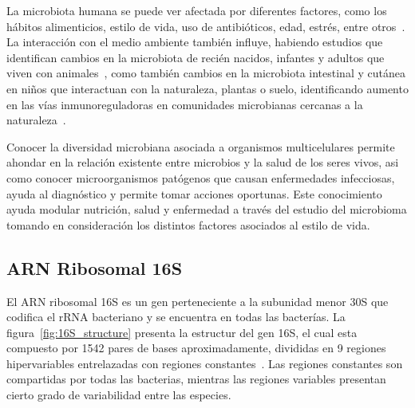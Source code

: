 La microbiota humana se puede ver afectada por diferentes factores, como los hábitos alimenticios, estilo de vida, uso de antibióticos, edad, estrés, entre otros~\cite{altvecs2020interaction}. 
La interacción con el medio ambiente también influye, habiendo estudios que identifican cambios en la microbiota de recién nacidos, infantes y adultos que viven con animales~\cite{tun2017exposure, azad2013infant,kates2020household}, como también cambios en la microbiota intestinal y cutánea en niños que interactuan con la naturaleza, plantas o suelo, identificando aumento en las vías inmunoreguladoras en comunidades microbianas cercanas a la naturaleza~\cite{roslund2020biodiversity}.




Conocer la diversidad microbiana asociada a organismos multicelulares permite ahondar en la relación existente entre microbios y la salud de los seres vivos, asi como conocer microorganismos patógenos que causan enfermedades infecciosas, ayuda al diagnóstico y permite tomar acciones oportunas. 
Este conocimiento ayuda modular nutrición, salud y enfermedad a través del estudio del microbioma tomando en consideración los distintos factores asociados al estilo de vida.
\subsection{ARN Ribosomal 16S}
El ARN ribosomal 16S es un gen perteneciente a la subunidad menor 30S que codifica el rRNA bacteriano y se encuentra en todas las bacterías. 
La figura~\ref{fig:16S_structure} presenta la estructur del gen 16S, el cual esta compuesto por 1542 pares de bases aproximadamente, divididas en 9 regiones hipervariables entrelazadas con regiones constantes~\cite{clarridge2004impact}.
Las regiones constantes son compartidas por todas las bacterias, mientras las regiones variables presentan cierto grado de variabilidad entre las especies. 


